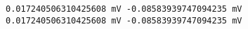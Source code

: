 \documentclass[11pt]{article}
\begin{document}
    \begin{Verbatim}[commandchars=\\\{\}]
0.017240506310425608 mV -0.08583939747094235 mV
0.017240506310425608 mV -0.08583939747094235 mV
    \end{Verbatim}

    \begin{center}
    \end{center}
    { \hspace*{\fill} \\}
    

    
    
    
\end{document}
